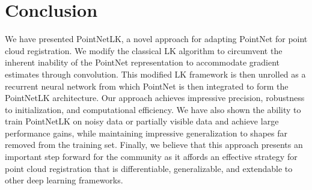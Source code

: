 \documentclass[10pt,twocolumn,letterpaper]{article}
\begin{document}
\section{Conclusion} \label{conclusion}
We have presented PointNetLK, a novel approach for adapting PointNet for point cloud registration. We modify the classical LK algorithm to circumvent the inherent inability of the PointNet representation to accommodate gradient estimates through convolution. This modified LK framework is then unrolled as a recurrent neural network from which PointNet is then integrated to form the PointNetLK architecture. Our approach achieves impressive precision, robustness to initialization, and computational efficiency. We have also shown the ability to train PointNetLK on noisy data or partially visible data and achieve large performance gains, while maintaining impressive generalization to shapes far removed from the training set. Finally, we believe that this approach presents an important step forward for the community as it affords an effective strategy for point cloud registration that is differentiable, generalizable, and extendable to other deep learning frameworks.

{\small


}
\end{document}
